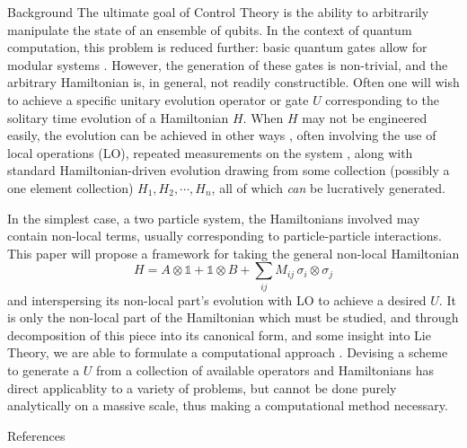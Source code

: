 \documentclass[12pt]{beamer}
\begin{document}
	\begin{frame}
		\begin{columns}
			\begin{column}{.45\textwidth}
				\begin{exampleblock}{Background}
					The ultimate goal of Control Theory is the ability to arbitrarily manipulate the state of an ensemble of qubits. In the context of quantum computation, this problem is reduced further: basic quantum gates allow for modular systems \cite{bremner}. However, the generation of these gates is non-trivial, and the arbitrary Hamiltonian is, in general, not readily constructible. Often one will wish to achieve a specific unitary evolution operator or gate $U$ corresponding to the solitary time evolution of a Hamiltonian $H$. When $H$ may not be engineered easily, the evolution can be achieved in other ways \cite{bremner} , often involving the use of local operations (LO), repeated measurements on the system \cite{bennett}, along with standard Hamiltonian-driven evolution drawing from some collection (possibly a one element collection) $H_1, H_2, \cdots, H_n$, all of which \emph{can} be lucratively generated.

	In the simplest case, a two particle system, the Hamiltonians involved may contain non-local terms, usually corresponding to particle-particle interactions. This paper will propose a framework for taking the general non-local Hamiltonian \cite{bennett} 
	\begin{equation}
	H = A \otimes \mathds{1} + \mathds{1} \otimes B + \sum_{ij} M_{ij}\,  \sigma_i \otimes \sigma_j
	\end{equation}
	and interspersing its non-local part's evolution with LO to achieve a desired $U$. It is only the non-local part of the Hamiltonian which must be studied, and through decomposition of this piece into its canonical form, and some insight into Lie Theory, we are able to formulate a computational approach \cite{haselgrove}. Devising a scheme to generate a $U$ from a collection of available operators and Hamiltonians has direct applicablity to a variety of problems, but cannot be done purely analytically on a massive scale, thus making a computational method necessary.
				\end{exampleblock}
				\vspace{1em}
								\begin{block}{References}
					
						
				\end{block}
			\end{column}
		\end{columns}
	\end{frame}	
\centering
\end{document}
